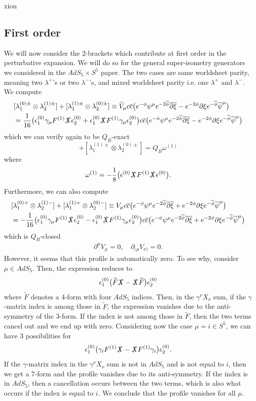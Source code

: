 xion\documentclass[12pt]{article}
\def\be{\begin{equation}}
\def\ee{\end{equation}}
\def\ie{\begin{equation}\begin{aligned}}
\def\fe{\end{aligned}\end{equation}}
\numberwithin{equation}{section}
\newcommand{\WT}[1]{\widetilde{#1}}
\newcommand{\B}[1]{\overline{#1}}
\begin{document}
\subsection{First order}
We will now consider the 2-brackets which contribute at first order in the perturbative expansion. We will do so for the general super-isometry generators we considered in the $AdS_5\times S^5$ paper. The two cases are same worldsheet parity, meaning two $\lambda^+$'s or two $\lambda^-$'s, and mixed worldsheet parity i.e. one $\lambda^+$ and $\lambda^-$. We compute
\ie
    &[\lambda_1^{(0)\pm}\otimes\lambda_2^{(1)\pm}]+[\lambda_1^{(1)\pm}\otimes\lambda_2^{(0)\pm}]\equiv\WT{V}_{\mu}c\B{c}\big(e^{-\phi}\psi^{\mu}e^{-2\B{\phi}}\B{\partial}\B{\xi}-e^{-2\phi}\partial\xi e^{-\B{\phi}}\B{\psi}^{\mu}\big)\\
    &=\frac{1}{16}\big(\epsilon_1^{(0)}\gamma_{\mu}F^{(1)}\slashed{X}\epsilon_2^{(0)}+\epsilon_1^{(0)}\slashed{X}F^{(1)}\gamma_{\mu}\epsilon_2^{(0)}\big)c\B{c}\big(e^{-\phi}\psi^{\mu}e^{-2\B{\phi}}\B{\partial}\B{\xi}-e^{-2\phi}\partial\xi e^{-\B{\phi}}\B{\psi}^{\mu}\big)
\fe
which we can verify again to be $Q_B$-exact
\be
    [\lambda_1^{(0)\pm}\otimes\lambda_2^{(1)\pm}]+[\lambda_1^{(1)\pm}\otimes\lambda_2^{(0)\pm}]=Q_B\omega^{(1)}
\ee
where
\be
    \omega^{(1)}=-\frac{1}{8}\big(\epsilon^{(0)}\slashed{X}F^{(1)}\slashed{X}\epsilon^{(0)}\big).
\ee
Furthermore, we can also compute
\ie \label{P1st}
    &[\lambda_1^{(0)+}\otimes\lambda_2^{(1)-}]+[\lambda_1^{(1)+}\otimes\lambda_2^{(0)-}]\equiv V_{\mu}c\B{c}\big(e^{-\phi}\psi^{\mu}e^{-2\B{\phi}}\B{\partial}\B{\xi}+e^{-2\phi}\partial\xi e^{-\B{\phi}}\B{\psi}^{\mu}\big)\\
    &=-\frac{1}{16}\big(\epsilon_1^{(0)}\gamma_{\mu}F^{(1)}\slashed{X}\epsilon_2^{(0)}-\epsilon_1^{(0)}\slashed{X}F^{(1)}\gamma_{\mu}\epsilon_2^{(0)}\big)c\B{c}\big(e^{-\phi}\psi^{\mu}e^{-2\B{\phi}}\B{\partial}\B{\xi}+e^{-2\phi}\partial\xi e^{-\B{\phi}}\B{\psi}^{\mu}\big)
\fe
which is $Q_B$-closed
\ie
\partial^{\mu}{V}_{\mu}=0,\quad \partial_{(\mu}{V}_{\nu)}=0.
\fe
However, it seems that this profile is automatically zero. To see why, consider $\mu\in AdS_5$. Then, the expression reduces to
\be
\epsilon_1^{(0)}\big(\WT{F}\slashed{X}-\slashed{X}\WT{F}\big)\epsilon_2^{(0)}
\ee
where $\WT{F}$ denotes a 4-form with four $AdS_5$ indices. Then, in the $\gamma^{\nu}X_{\nu}$ sum, if the $\gamma$-matrix index is among those in $\WT{F}$, the expression vanishes due to the anti-symmetry of the 3-form. If the index is not among those in $\WT{F}$, then the two terms cancel out and we end up with zero. Considering now the case $\mu=i\in S^5$, we can have 3 possibilities for
\be
\epsilon_1^{(0)}\big(\gamma_i{F}^{(1)}\slashed{X}-\slashed{X}{F}^{(1)}\gamma_i\big)\epsilon_2^{(0)}.
\ee
If the $\gamma$-matrix index in the $\gamma^{\nu}X_{\nu}$ sum is not in $AdS_5$ and is not equal to $i$, then we get a 7-form and the profile vanishes due to its anti-symmetry. If the index is in $AdS_5$, then a cancellation occurs between the two terms, which is also what occurs if the index is equal to $i$. We conclude that the profile vanishes for all $\mu$.
\end{document}
